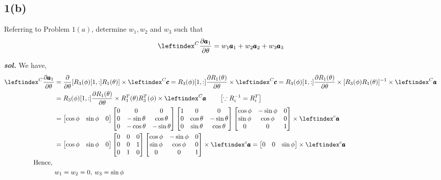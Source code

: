 \subsection{1(b)}
Referring to Problem $1(a)$, determine $w_1, w_2$ and  $w_3$ such that
$$ \lx{^C}{\frac{\partial \pmb a_1}{\partial \theta}} = w_1 \pmb a_1 + w_2 \pmb a_2 + w_3 \pmb a_3$$

\textbf{\textit{sol.}}
We have,
\begin{align*}
    \lx{^C}{\frac{\partial \pmb a_1}{\partial \theta}}  &=
    \frac{\partial}{\partial \theta} [R_3(\phi)[1,:]R_1(\theta)] \times \lx{^C}{\pmb c}
    = R_3(\phi)[1,:] \frac{\partial R_1(\theta)}{\partial \theta} \times \lx{^C}{\pmb c}
    = R_3(\phi)[1,:] \frac{\partial R_1(\theta)}{\partial \theta} \times [R_3(\phi)R_1(\theta)]^{-1} \times \lx{^C}{\pmb a}\\
    &=R_3(\phi)[1,:] \frac{\partial R_1(\theta)}{\partial \theta} \times R_1^T(\theta) R_3^T(\phi)\times \lx{^C}{\pmb a}
    \qquad \left[ \because R_i^{-1} = R_i^T \right]\\
    &= \bm{\cos \phi & \sin \phi  & 0}
    \bm{
            0 & 0 & 0\\
            0 & -\sin \theta & \cos \theta\\
            0 & -\cos \theta & -\sin \theta
        }
    \bm{
            1 & 0 & 0\\
            0 & \cos \theta & -\sin \theta\\
            0 & \sin \theta & \cos \theta
    }
    \bm{
            \cos \phi & -\sin \phi  & 0\\
            \sin \phi & \cos \phi & 0\\
            0          & 0         & 1
        }
    \times \lx{^c}{\pmb a}\\
    &= \bm{\cos \phi & \sin \phi  & 0}
    \bm{
            0 & 0 & 0\\
            0 & 0 & 1\\
            0 & 1 & 0
        }
    \bm{
            \cos \phi & -\sin \phi  & 0\\
            \sin \phi & \cos \phi & 0\\
            0          & 0         & 1
        }
    \times \lx{^c}{\pmb a}
    = \bm{0 & 0 & \sin \phi} \times \lx{^c}{\pmb a}\\
    \text{Hence, }&\\
    & w_1 = w_2 = 0, \: w_3 = \sin \phi
\end{align*}
